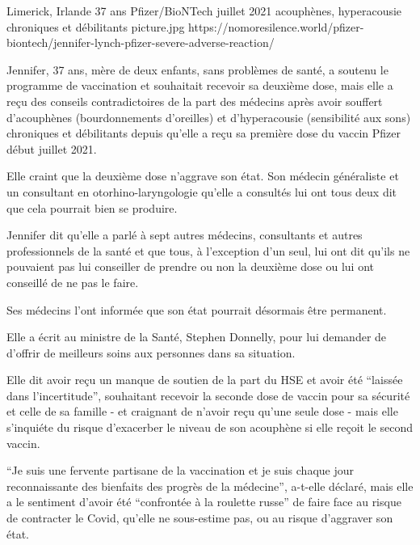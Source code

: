 {Limerick, Irlande}
{37 ans}
{Pfizer/BioNTech}
{juillet 2021}
{acouphènes, hyperacousie chroniques et débilitants}
{picture.jpg}
{https://nomoresilence.world/pfizer-biontech/jennifer-lynch-pfizer-severe-adverse-reaction/}
{

Jennifer, 37 ans, mère de deux enfants, sans problèmes de santé, a soutenu le
programme de vaccination et souhaitait recevoir sa deuxième dose, mais elle a
reçu des conseils contradictoires de la part des médecins après avoir souffert
d'acouphènes (bourdonnements d'oreilles) et d'hyperacousie (sensibilité aux
sons) chroniques et débilitants depuis qu'elle a reçu sa première dose du vaccin
Pfizer début juillet 2021.

Elle craint que la deuxième dose n'aggrave son état. Son médecin généraliste et
un consultant en otorhino-laryngologie qu'elle a consultés lui ont tous deux dit
que cela pourrait bien se produire.

Jennifer dit qu'elle a parlé à sept autres médecins, consultants et autres
professionnels de la santé et que tous, à l'exception d'un seul, lui ont dit
qu'ils ne pouvaient pas lui conseiller de prendre ou non la deuxième dose ou lui
ont conseillé de ne pas le faire.

Ses médecins l'ont informée que son état pourrait désormais être permanent.

Elle a écrit au ministre de la Santé, Stephen Donnelly, pour lui demander de
d'offrir de meilleurs soins aux personnes dans sa situation.

Elle dit avoir reçu un manque de soutien de la part du HSE et avoir été “laissée
dans l'incertitude”, souhaitant recevoir la seconde dose de vaccin pour sa
sécurité et celle de sa famille - et craignant de n'avoir reçu qu'une seule dose
- mais elle s'inquiéte du risque d'exacerber le niveau de son acouphène si elle
reçoit le second vaccin.

“Je suis une fervente partisane de la vaccination et je suis chaque jour
reconnaissante des bienfaits des progrès de la médecine”, a-t-elle déclaré, mais
elle a le sentiment d'avoir été “confrontée à la roulette russe” de faire face
au risque de contracter le Covid, qu'elle ne sous-estime pas, ou au risque
d'aggraver son état.

}
